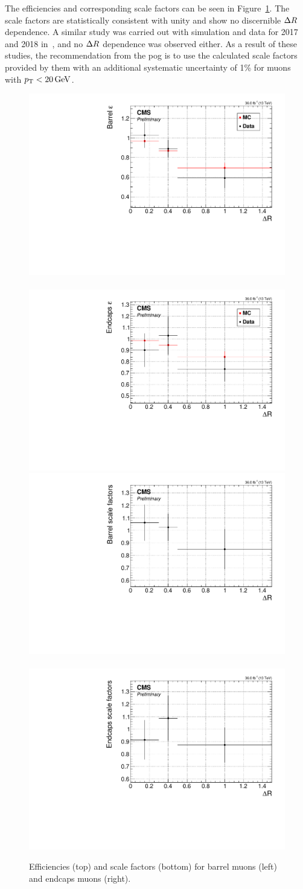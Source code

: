 The efficiencies and corresponding scale factors can be seen in Figure~\ref{fig:tb-eff-sf}. The scale factors are statistically consistent with unity and show no discernible $\Delta R$ dependence. A similar study was carried out with simulation and data for 2017 and 2018 in~\cite{muon-id-sf-2017-8}, and no $\Delta R$ dependence was observed either. As a result of these studies, the recommendation from the \gls{pog} is to use the calculated scale factors provided by them with an additional systematic uncertainty of 1\% for muons with $p_{\mathrm{T}}<20\,\text{Ge\hspace{-.08em}V}$.

\begin{figure}[!htbp]
\centering
\includegraphics[width=0.48\linewidth]{plots/scale_factors/barrelDeltaRSingleElectron.pdf} \,
\includegraphics[width=0.48\linewidth]{plots/scale_factors/endcapsDeltaRSingleElectron.pdf}  \\
\includegraphics[width=0.48\linewidth]{plots/scale_factors/barrelDeltaRisoScaleFactorsSingleElectron.pdf} \,
\includegraphics[width=0.48\linewidth]{plots/scale_factors/endcapsDeltaRisoScaleFactorsSingleElectron.pdf} \\
\caption[Efficiencies and scale factors]{Efficiencies (top) and scale factors (bottom) for barrel muons (left) and endcaps muons (right).}
\label{fig:tb-eff-sf}
\end{figure}